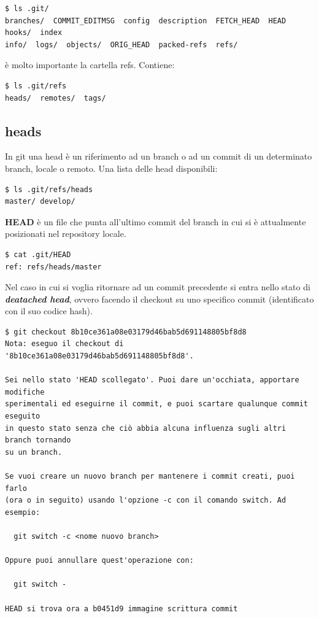 \documentclass{article}
\begin{document}
\begin{verbatim}
$ ls .git/
branches/  COMMIT_EDITMSG  config  description  FETCH_HEAD  HEAD  hooks/  index  
info/  logs/  objects/  ORIG_HEAD  packed-refs  refs/
\end{verbatim}

è molto importante la cartella refs. Contiene:

\begin{verbatim}
$ ls .git/refs
heads/  remotes/  tags/
\end{verbatim}

\subsection{heads\label{heads}}
In git una head è un riferimento ad un branch o ad un commit di un determinato
branch, locale o remoto. Una lista delle head disponibili:

\begin{verbatim}
$ ls .git/refs/heads
master/ develop/
\end{verbatim}

\textbf{HEAD} è un file che punta all'ultimo commit del branch in cui si è
attualmente posizionati nel repository locale.

\begin{verbatim}
$ cat .git/HEAD
ref: refs/heads/master
\end{verbatim}

Nel caso in cui si voglia ritornare ad un commit precedente si entra nello stato
di \emph{\textbf{deatached head}}, ovvero facendo il checkout su uno specifico commit
(identificato con il suo codice hash).

\begin{verbatim}
$ git checkout 8b10ce361a08e03179d46bab5d691148805bf8d8
Nota: eseguo il checkout di '8b10ce361a08e03179d46bab5d691148805bf8d8'.

Sei nello stato 'HEAD scollegato'. Puoi dare un'occhiata, apportare modifiche
sperimentali ed eseguirne il commit, e puoi scartare qualunque commit eseguito
in questo stato senza che ciò abbia alcuna influenza sugli altri branch tornando
su un branch.

Se vuoi creare un nuovo branch per mantenere i commit creati, puoi farlo
(ora o in seguito) usando l'opzione -c con il comando switch. Ad esempio:

  git switch -c <nome nuovo branch>

Oppure puoi annullare quest'operazione con:

  git switch -

HEAD si trova ora a b0451d9 immagine scrittura commit
\end{verbatim}
\end{document}
